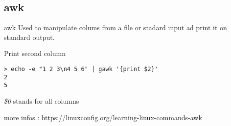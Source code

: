 \subsection{awk}

\begin{frame}[fragile]{awk}
Used to manipulate colums from a file or stadard input ad print it on standard output.
  \pause
  \begin{exampleblock}{Print second column}
    \begin{lstlisting}[showstringspaces=false]
> echo -e "1 2 3\n4 5 6" | gawk '{print $2}'
2
5
    \end{lstlisting}
  \end{exampleblock}
\pause
\emph{\$0} stands for all columns
\pause

more infos : https://linuxconfig.org/learning-linux-commands-awk
\end{frame}

